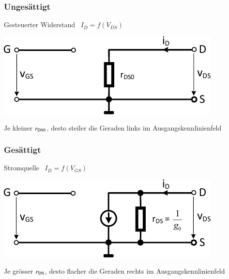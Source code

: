 \begin{minipage}[t]{0.48\columnwidth}
    \raggedright

    \subsubsection*{Ungesättigt}

    Gesteuerter Widerstand \rightarrow\ $I_D = f(V_{DS})$
    
    \includegraphics[width=\columnwidth, align=t]{images/MOSFET_ersatzschaltung_ungesaettigt.pdf}

    \smallskip
    Je kleiner $r_{\rm DS0}$, desto steiler die Geraden links im Ausgangskennlinienfeld

\end{minipage}
\hfill
\begin{minipage}[t]{0.48\columnwidth}
    \raggedright

    \subsubsection*{Gesättigt}

    Stromquelle \rightarrow\ $I_D = f(V_{GS})$

    \includegraphics[width=\columnwidth, align=t]{images/MOSFET_ersatzschaltung_gesaettigt.pdf}

    \smallskip
    Je grösser $r_{\rm DS}$, desto flacher die Geraden rechts im Ausgangskennlinienfeld
\end{minipage}


